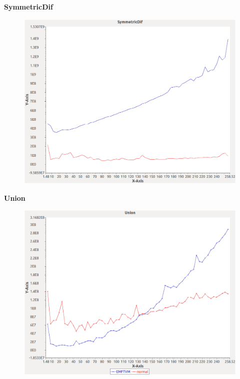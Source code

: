 \noindent\textbf{SymmetricDif}

\begin{figure}[h]
\centering
\includegraphics[width=\textwidth]{graphs/set/SymmetricDif}
\end{figure}
\pagebreak

\noindent\textbf{Union}

\begin{figure}[h]
\centering
\includegraphics[width=\textwidth]{graphs/set/Union}
\end{figure}
\pagebreak